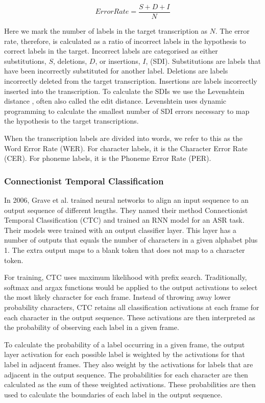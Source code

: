 \begin{equation}
    ErrorRate=\frac{S+D+I}{N}
\end{equation}

Here we mark the number of labels in the target transcription as $N$. The error rate, therefore, is calculated as a ratio of incorrect labels in the hypothesis to correct labels in the target. Incorrect labels are categorised as either substitutions, $S$, deletions, $D$, or insertions, $I$, (SDI). Substitutions are labels that have been incorrectly substituted for another label. Deletions are labels incorrectly deleted from the target transcription. Insertions are labels incorrectly inserted into the transcription. To calculate the SDIs we use the Levenshtein distance \cite{levenshtein1966binary}, often also called the edit distance. Levenshtein uses dynamic programming to calculate the smallest number of SDI errors necessary to map the hypothesis to the target transcriptions.

When the transcription labels are divided into words, we refer to this as the Word Error Rate (WER). For character labels, it is the Character Error Rate (CER). For phoneme labels, it is the Phoneme Error Rate (PER). 

\subsubsection{Connectionist Temporal Classification}
In 2006, Grave et al. \cite{graves2006connectionist} trained neural networks to align an input sequence to an output sequence of different lengths. They named their method Connectionist Temporal Classification (CTC) and trained an RNN model for an ASR task. Their models were trained with an output classifier layer. This layer has a number of outputs that equals the number of characters in a given alphabet plus 1. The extra output maps to a blank token that does not map to a character token. 

For training, CTC uses maximum likelihood with prefix search. Traditionally, softmax and argax functions would be applied to the output activations to select the most likely character for each frame. Instead of throwing away lower probability characters, CTC retains all classification activations at each frame for each character in the output sequence. These activations are then interpreted as the probability of observing each label in a given frame. 

To calculate the probability of a label occurring in a given frame, the output layer activation for each possible label is weighted by the activations for that label in adjacent frames. They also weight by the activations for labels that are adjacent in the output sequence. The probabilities for each character are then calculated as the sum of these weighted activations. These probabilities are then used to calculate the boundaries of each label in the output sequence. 

